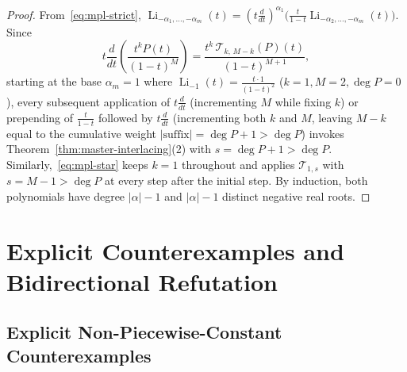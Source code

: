 \documentclass[11pt]{article}
\theoremstyle{definition}
\newcommand{\Li}{\operatorname{Li}}
\begin{document}
\begin{proof}
From~\eqref{eq:mpl-strict}, $\Li_{-\alpha_1,\dots,-\alpha_m}(t) = (t\frac{d}{dt})^{\alpha_1}
\bigl(\frac{t}{1-t}\Li_{-\alpha_2,\dots,-\alpha_m}(t)\bigr)$. Since
\[
  t\frac{d}{dt}\left(\frac{t^k P(t)}{(1-t)^M}\right)
  = \frac{t^k\,\mathcal{T}_{k,\,M-k}(P)(t)}{(1-t)^{M+1}},
\]
starting at the base $\alpha_m = 1$ where $\Li_{-1}(t) = \frac{t \cdot 1}{(1-t)^2}$ ($k=1,
M=2, \deg P = 0$), every subsequent application of $t\frac{d}{dt}$ (incrementing $M$ while
fixing $k$) or prepending of $\frac{t}{1-t}$ followed by $t\frac{d}{dt}$ (incrementing both
$k$ and $M$, leaving $M-k$ equal to the cumulative weight $|\text{suffix}| = \deg P + 1 >
\deg P$) invokes Theorem~\ref{thm:master-interlacing}(2) with $s = \deg P + 1 > \deg P$.
Similarly,~\eqref{eq:mpl-star} keeps $k=1$ throughout and applies $\mathcal{T}_{1,s}$ with
$s = M - 1 > \deg P$ at every step after the initial step. By induction, both polynomials
have degree $|\alpha|-1$ and $|\alpha|-1$ distinct negative real roots.
\end{proof}

\section{Explicit Counterexamples and Bidirectional Refutation}

\subsection{Explicit Non-Piecewise-Constant Counterexamples}
\end{document}
